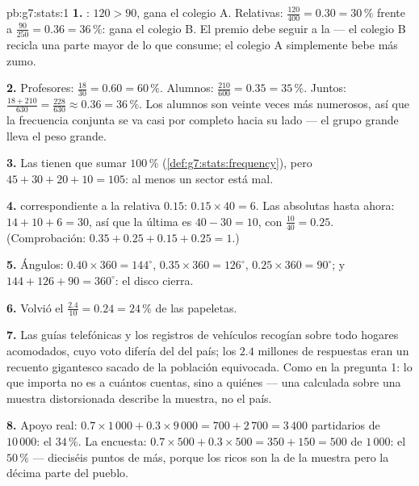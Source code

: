 \begin{solution}{pb:g7:stats:1}
\textbf{1.} : $120 > 90$, gana el colegio A. Relativas:
$\frac{120}{400} = 0.30 = 30\,\%$ frente a
$\frac{90}{250} = 0.36 = 36\,\%$: gana el colegio B. El premio
debe seguir a la  --- el colegio B recicla una parte mayor
de lo que consume; el colegio A simplemente bebe más zumo.

\textbf{2.} Profesores: $\frac{18}{30} = 0.60 = 60\,\%$. Alumnos:
$\frac{210}{600} = 0.35 = 35\,\%$. Juntos:
$\frac{18 + 210}{630} = \frac{228}{630} \approx 0.36 =
36\,\%$. Los alumnos son veinte veces más numerosos, así que la
frecuencia conjunta se va casi por completo hacia su lado ---
el grupo grande lleva el peso grande.

\textbf{3.} Las  tienen que sumar $100\,\%$
(\cref{def:g7:stats:frequency}), pero
$45 + 30 + 20 + 10 = 105$: al menos un sector está mal.

\textbf{4.}  correspondiente a la relativa $0.15$:
$0.15 \times 40 = 6$. Las absolutas hasta ahora: $14 + 10 + 6 = 30$, así que
la última es $40 - 30 = 10$, con 
$\frac{10}{40} = 0.25$. (Comprobación: $0.35 + 0.25 + 0.15 + 0.25 =
1$.)

\textbf{5.} Ángulos: $0.40 \times 360 = 144^\circ$,
$0.35 \times 360 = 126^\circ$, $0.25 \times 360 = 90^\circ$;
y $144 + 126 + 90 = 360^\circ$: el disco cierra.

\textbf{6.} Volvió el $\frac{2.4}{10} = 0.24 = 24\,\%$ de las
papeletas.

\textbf{7.} Las guías telefónicas y los registros de vehículos recogían
sobre todo hogares acomodados, cuyo voto difería del
del país; los $2.4$ millones de respuestas eran un recuento gigantesco sacado
de la población equivocada. Como en la pregunta 1: lo que importa no
es a cuántos cuentas, sino a quiénes --- una  calculada sobre una
muestra distorsionada describe la muestra, no el país.

\textbf{8.} Apoyo real:
$0.7 \times 1\,000 + 0.3 \times 9\,000 = 700 + 2\,700 = 3\,400$
partidarios de $10\,000$: el $34\,\%$. La encuesta:
$0.7 \times 500 + 0.3 \times 500 = 350 + 150 = 500$ de
$1\,000$: el $50\,\%$ --- dieciséis puntos de más, porque los
ricos son la  de la muestra pero la décima parte del pueblo.


\end{solution}
